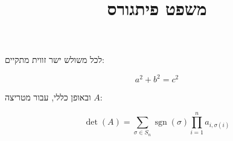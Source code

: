 \documentclass[11pt,a4paper]{article}
\title{משפט פיתגורס}
\date{}
\begin{document}
\maketitle

לכל משולש ישר זווית מתקיים:

\[
a^2 + b^2 = c^2
\]

ובאופן כללי, עבור מטריצה $A$:

\[
\det(A) = \sum_{\sigma \in S_n} \operatorname{sgn}(\sigma) \prod_{i=1}^{n} a_{i,\sigma(i)}
\]
\end{document}

